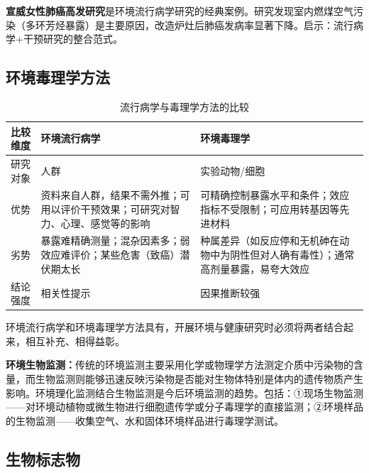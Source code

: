 \documentclass[10pt,a4paper,oneside]{ctexbook}
\begin{document}
\begin{tipbox}
\textbf{宣威女性肺癌高发研究}是环境流行病学研究的经典案例。研究发现室内燃煤空气污染（多环芳烃暴露）是主要原因，改造炉灶后肺癌发病率显著下降。启示：流行病学+干预研究的整合范式。
\end{tipbox}

\subsection{环境毒理学方法}

\begin{table}[htbp]
\centering
\caption{流行病学与毒理学方法的比较}
\begin{tabularx}{\textwidth}{lXX}
\hline
\textbf{比较维度} & \textbf{环境流行病学} & \textbf{环境毒理学} \\
\hline
研究对象 & 人群 & 实验动物/细胞 \\
优势 & 资料来自人群，结果不需外推；可用以评价干预效果；可研究对智力、心理、感觉等的影响 & 可精确控制暴露水平和条件；效应指标不受限制；可应用转基因等先进材料 \\
劣势 & 暴露难精确测量；混杂因素多；弱效应难评价；某些危害（致癌）潜伏期太长 & 种属差异（如反应停和无机砷在动物中为阴性但对人确有毒性）；通常高剂量暴露，易夸大效应 \\
结论强度 & 相关性提示 & 因果推断较强 \\
\hline
\end{tabularx}
\end{table}

\begin{tipbox}
环境流行病学和环境毒理学方法具有，开展环境与健康研究时必须将两者结合起来，相互补充、相得益彰。

\textbf{环境生物监测：}传统的环境监测主要采用化学或物理学方法测定介质中污染物的含量，而生物监测则能够迅速反映污染物是否能对生物体特别是体内的遗传物质产生影响。环境理化监测结合生物监测是今后环境监测的趋势。包括：①现场生物监测——对环境动植物或微生物进行细胞遗传学或分子毒理学的直接监测；②环境样品的生物监测——收集空气、水和固体环境样品进行毒理学测试。
\end{tipbox}

\subsection{生物标志物}
\end{document}
